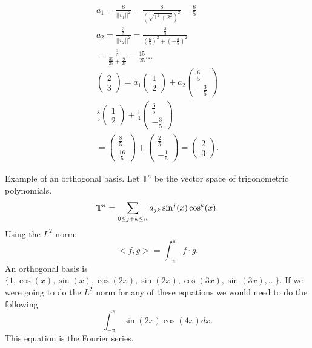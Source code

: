   \begin{align*}
    a_1=\frac{8}{| | v_1| |^2}=\frac{8}{(\sqrt{1^2+2^2} )^2}=\frac{8}{5}\\
    a_2=\frac{\frac{3}{5}}{| | v_2 | |^2}=\frac{\frac{3}{5}}{\left(\frac{6}{5}\right)^2+\left(-\frac{3}{5}\right)^2}\\
    =\frac{\frac{3}{5}}{\frac{36}{25}+\frac{9}{25}}=\frac{15}{25}\ldots\\
    \begin{pmatrix} 2\\3 \end{pmatrix} =a_1\begin{pmatrix} 1\\2 \end{pmatrix} +a_2\begin{pmatrix} \frac{6}{5}\\-\frac{3}{5} \end{pmatrix} \\
    \frac{8}{5}\begin{pmatrix} 1\\2 \end{pmatrix} + \frac{1}{3}\begin{pmatrix} \frac{6}{5}\\-\frac{3}{5} \end{pmatrix} \\
    =\begin{pmatrix} \frac{8}{5}\\\frac{16}{5} \end{pmatrix} +\begin{pmatrix} \frac{2}{5}\\-\frac{1}{5} \end{pmatrix} =\begin{pmatrix} 2\\3 \end{pmatrix} 
  .\end{align*}

  \begin{problem}
    Example of an orthogonal basis. Let $\mathbb{T}^{n}$ be the vector space of trigonometric polynomials.
    \[
      \mathbb{T}^{n}=\sum_{0\le j+k\le n}a_{jk}\sin^{j}(x)\cos^k(x)\\
    .\] 
    Using the $L^2$ norm:
    \[
      <f,g> = \int_{-\pi}^{\pi}f\cdot g
    .\] 
    An orthogonal basis is $\{1,\cos(x),\sin(x),\cos(2x),\sin(2x),\cos(3x),\sin(3x),\ldots\}$. If we were going to do the $L^2$ norm for any of these equations we would need to do the following
    \[
      \int_{-\pi}^{\pi}\sin(2x)\cos(4x)dx
    .\] 
    This equation is the Fourier series.
  \end{problem}



























